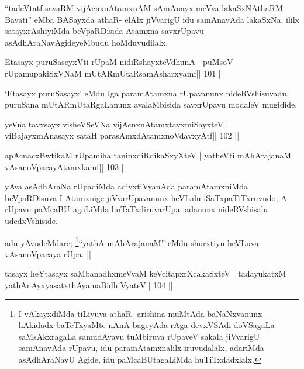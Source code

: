 \begin{artha}
``tadeVtatf savaRM vijAcnxnAtamxnAM sAmAnayx meVva lakaSxNAthaRM   Bavati'' eMba BASayxda athaR- elAlx jiVvarigU idu samAnavAda   lakaSxNa. ililx satayxrAshiyiMda beVpaRDisida Atamxna savxrUpavu   asAdhAraNavAgideyeMbudu hoMduvudilalx.
\end{artha}



\begin{shl}
Etasayx puruSaseyxVti rUpaM nidiRshayxteV\s dhunA |
puMsoV rUpamupakiSxVNaM mUtARmUtaRsamAsharxyamf\hfill || 101 ||
\end{shl}

\begin{artha}
`Etasayx puruSasayx' eMdu Iga paramAtamxna rUpavanunx nideRVshisuvadu,   puruSana mUtARmUtaRgaLanunx avalaMbisida savxrUpavu modaleV   mugidide.
\end{artha}

\begin{shl}
yeVna tavxsayx visheVSeVNa vijAcnxnAtamxtavxmiSayxteV |
viBajayxmAnasayx sataH parasAmxdAtamxnoV\s davxyAtf\hfill || 102 ||
\end{shl}

\begin{shl}
apAcnacxBwtikaM rUpamiha taninxdiRdikaSxyXteV |
yatheVti mAhArajanaM vAsanoVpacayAtamxkamf\hfill || 103 ||
\end{shl}

\begin{artha}
yAva asAdhAraNa rUpadiMda adivxtiVyanAda paramAtamxniMda beVpaRDisuva
I Atamxnige jiVvarUpavanunx heVLalu iSaTxpaTiTxruvudo, A rUpavu
paMcaBUtagaLiMda huTaTxdiruvarUpa. adanunx nideRVshisalu udedxVshiside.
\end{artha}

\begin{artha}
adu yAvudeMdare; \footnote{I vAkayxdiMda tiLiyuva athaR- arishina
  muMtAda baNaNxvanunx hAkidadx baTeTxyaMte nAnA bageyAda rAga
  devxVSAdi doVSagaLa saMsAkxragaLa samudAyavu tuMbiruva
  rUpaveV sakala jiVvarigU samAnavAda rUpavu, idu paramAtamxnalilx
  iruvudalalx, adariMda asAdhAraNavU Agide, idu paMcaBUtagaLiMda 
  huTiTxdadxlalx.}``yathA mAhArajanaM'' eMdu shurxtiyu
heVLuva vAsanoVpacaya rUpa. ||
\end{artha}


\begin{shl}
tasayx heYtasayx saMbanadhxmeVvaM keVcitapxrXcakaSxteV |
tadayukatxM yathA\s nAyxyasatxthA\s yamaBidhiVyateV\hfill || 104 ||
\end{shl}

